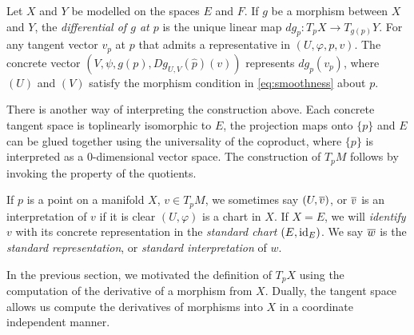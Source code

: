 \documentclass[../main-manifolds.tex]{subfiles}
\begin{document}
\begin{definition}
    Let $X$ and $Y$ be modelled on the spaces $E$ and $F$. If $g$ be a morphism between $X$ and $Y$, the \emph{differential of $g$ at $p$} is the unique linear map $dg_p: T_p X\to T_{g(p)} Y$. For any tangent vector $v_p$ at $p$ that admits a representative in $(U,\varphi,p,v)$. The concrete vector $(V,\psi,g(p), Dg_{U,V}(\hat{p})(v))$ represents $dg_p(v_p)$, where $(U)$ and $(V)$ satisfy the morphism condition in \cref{eq:smoothness} about $p$.
\end{definition}
\begin{note}
    There is another way of interpreting the construction above. Each concrete tangent space is toplinearly isomorphic to $E$, the projection maps onto $\{p\}$ and $E$ can be glued together using the universality of the coproduct, where $\{p\}$ is interpreted as a $0$-dimensional vector space. The construction of $T_pM$ follows by invoking the property of the quotients.
\end{note}
\begin{remark}\label{rmk:omission-of-chart-in-concrete-rep}
    If $p$ is a point on a manifold $X$, $v\in T_p M$, we sometimes say $(U,\overline{v})$, or $\overline{v}$ is an interpretation of $v$ if it is clear $(U,\varphi)$ is a chart in $X$. If $X=E$, we will \emph{identify} $v$ with its concrete representation in the \emph{standard chart} $(E,\operatorname{id}_{E})$. We say $\overline{w}$ is the \emph{standard representation}, or \emph{standard interpretation} of $w$.
\end{remark}
In the previous section, we motivated the definition of $T_pX$ using the computation of the derivative of a morphism from $X$. Dually, the tangent space allows us compute the derivatives of morphisms into $X$ in a coordinate independent manner.\\
\end{document}
